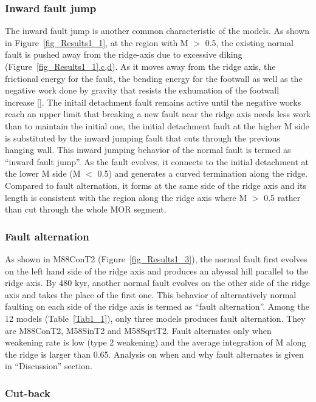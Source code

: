 \subsubsection{Inward fault jump}
The inward fault jump is another common characteristic of the models. As shown in Figure~\hyperref[fig_Results1_1]{\ref{fig_Results1_1}}, at the region with M $>$ 0.5, the existing normal fault is pushed away from the ridge-axis due to excessive diking (Figure~\hyperref[fig_Results1_1]{\ref{fig_Results1_1}.c,d}). As it moves away from the ridge axis, the frictional energy for the fault, the bending energy for the footwall as well as the negative work done by gravity that resists the exhumation of the footwall increase [\citealp{Lavier2000, Olive2014}]. The initail detachment fault remains active until the negative works reach an upper limit that breaking a new fault near the ridge axis needs less work than to maintain the initial one, the initial detachment fault at the higher M side is substituted by the inward jumping fault that cuts through the previous hanging wall. This inward jumping behavior of the normal fault is termed as ``inward fault jump''. As the fault evolves, it connects to the initial detachment at the lower M side (M $<$ 0.5) and generates a curved termination along the ridge. Compared to fault alternation, it forms at the same side of the ridge axis and its length is consistent with the region along the ridge axis where M $>$ 0.5 rather than cut through the whole MOR segment.
\subsubsection{Fault alternation}
As shown in M88ConT2 (Figure~\hyperref[fig_Results1_3]{\ref{fig_Results1_3}}), the normal fault first evolves on the left hand side of the ridge axis and produces an abyssal hill parallel to the ridge axis. By 480 kyr, another normal fault evolves on the other side of the ridge axis and takes the place of the first one. This behavior of alternatively normal faulting on each side of the ridge axis is termed as ``fault alternation''. Among the 12 models (Table~\hyperref[Tab1_1]{\ref{Tab1_1}}), only three models produces fault alternation. They are M88ConT2, M58SinT2 and M58SqrtT2. Fault alternates only when weakening rate is low (type 2 weakening) and the average integration of M along the ridge is larger than 0.65. Analysis on when and why fault alternates is given in ``Discussion'' section.

\subsubsection{Cut-back}\label{para_CutBack} 

